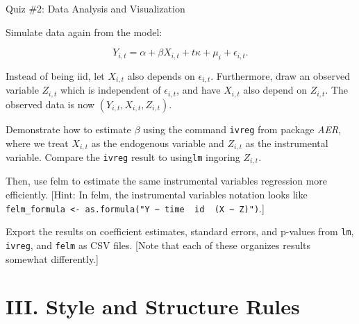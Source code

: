 \documentclass[10pt,ignorenonframetext,]{beamer}
\begin{document}
\begin{frame}[fragile]{Quiz \#2: Data Analysis and Visualization}

Simulate data again from the model:

\[
Y_{i,t} = \alpha + \beta X_{i,t} + t\kappa  + \mu_i + \epsilon_{i,t}.
\]

Instead of being iid, let \(X_{i,t}\) also depends on
\(\epsilon_{i,t}\). Furthermore, draw an observed variable \(Z_{i,t}\)
which is independent of \(\epsilon_{i,t}\), and have \(X_{i,t}\) also
depend on \(Z_{i,t}\). The observed data is now
\((Y_{i,t},X_{i,t},Z_{i,t})\).

Demonstrate how to estimate \(\beta\) using the command \texttt{ivreg}
from package \emph{AER}, where we treat \(X_{i,t}\) as the endogenous
variable and \(Z_{i,t}\) as the instrumental variable. Compare the
\texttt{ivreg} result to using\texttt{lm} ingoring \(Z_{i,t}\).

Then, use felm to estimate the same instrumental variables regression
more efficiently. {[}Hint: In felm, the instrumental variables notation
looks like
\texttt{felm\_formula\ \textless{}-\ as.formula("Y\ \textasciitilde{}\ time\ \textbar{}\ id\ \textbar{}\ (X\ \textasciitilde{}\ Z)")}.{]}

Export the results on coefficient estimates, standard errors, and
p-values from \texttt{lm}, \texttt{ivreg}, and \texttt{felm} as CSV
files. {[}Note that each of these organizes results somewhat
differently.{]}

\end{frame}

\section{III. Style and Structure
Rules}\label{iii.-style-and-structure-rules}
\end{document}
